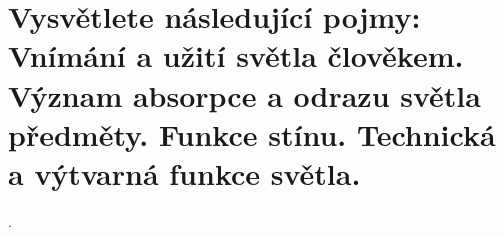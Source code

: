 \section{Vysvětlete následující pojmy: Vnímání a užití světla člověkem. Význam absorpce a odrazu světla předměty. 
Funkce stínu. Technická a výtvarná funkce světla.}.
